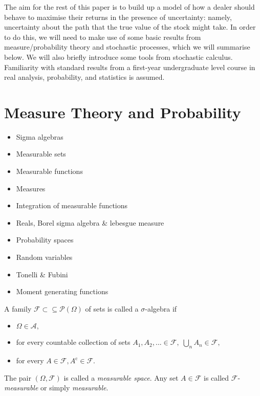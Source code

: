 The aim for the rest of this paper is to build up a model of how a dealer should behave to maximise their returns in the presence of uncertainty: 
namely, uncertainty about the path that the true value of the stock might take. 
In order to do this, we will need to make use of some basic results from measure/probability theory and stochastic processes, which we will
summarise below. We will also briefly introduce some tools from stochastic calculus. Familiarity with standard results 
from a first-year undergraduate level course in real analysis, probability, and statistics is assumed.

\section{Measure Theory and Probability}
\begin{itemize}
    \item Sigma algebras
    \item Measurable sets
    \item Measurable functions
    \item Measures
    \item Integration of measurable functions
    \item Reals, Borel sigma algebra \& lebesgue measure
    \item Probability spaces
    \item Random variables
    \item Tonelli \& Fubini
    \item Moment generating functions
\end{itemize}

\begin{definition}
    A family $\mathcal{F}\subset\subseteq\mathcal{P}(\Omega)$ of sets is called a $\sigma$-algebra if 
    \begin{itemize}
        \item $\Omega\in\mathcal{A},$
        \item for every countable collection of sets $A_1,A_2,...\in\mathcal{F},\;\bigcup_{n}A_n\in\mathcal{F},$
        \item for every $A\in\mathcal{F}, A^{\mathrm c}\in\mathcal{F}.$
    \end{itemize}
\end{definition}

\begin{remark}
    The pair $(\Omega,\mathcal{F})$ is called a \emph{measurable space}. Any set $A\in\mathcal{F}$
    is called $\mathcal{F}$-\emph{measurable} or simply \emph{measurable}.
\end{remark}

